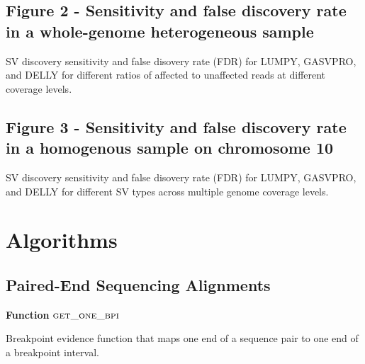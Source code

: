 \documentclass[10pt]{bmc_article}
\def\texttt{[image: ]}
\newenvironment{bmcformat}{\begin{raggedright}\baselineskip20pt\sloppy\setboolean{publ}{false}}{\end{raggedright}\baselineskip20pt\sloppy}
\begin{document}
\begin{bmcformat}
\subsection*{Figure 2 - Sensitivity and false discovery rate in a whole-genome
heterogeneous sample}
SV discovery sensitivity and false disovery rate (FDR) for LUMPY, GASVPRO, and
DELLY for different ratios of affected to unaffected reads at different coverage
levels.

\subsection*{Figure 3 - Sensitivity and false discovery rate in a homogenous
sample on chromosome 10}
SV discovery sensitivity and false disovery rate (FDR) for LUMPY, GASVPRO, and
DELLY for different SV types across multiple genome coverage levels.


\section*{Algorithms}

\subsection*{Paired-End Sequencing Alignments}
\label{pe:sec}
\begin{algorithm}[H]
    \DontPrintSemicolon
    \footnotesize
    \BlankLine
    \textbf{Function} $\textsc{get\_one\_bpi}$\;
	\caption{Breakpoint evidence function that maps one end of a sequence pair
			to one end of a breakpoint interval.}
    \label{get_one_bpi}
\end{algorithm}


\end{bmcformat}
\end{document}
